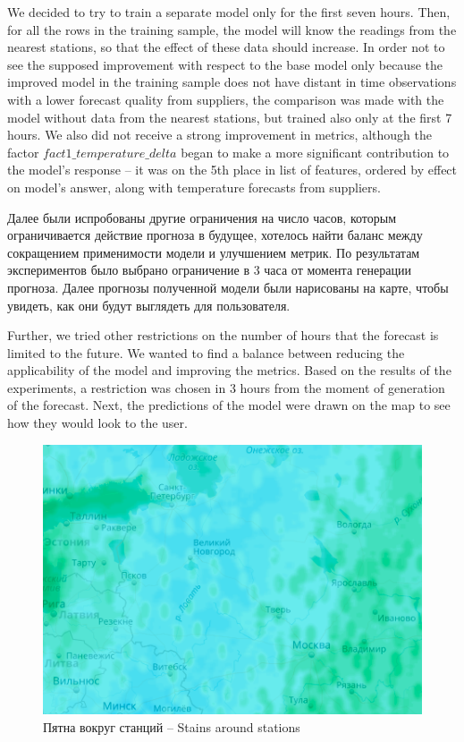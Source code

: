 \documentclass[14pt]{matmex-diploma}
\begin{document}
We decided to try to train a separate model only for the first seven hours. Then, for all the rows in the training sample, the model will know the readings from the nearest stations, so that the effect of these data should increase. In order not to see the supposed improvement with respect to the base model only because the improved model in the training sample does not have distant in time observations with a lower forecast quality from suppliers, the comparison was made with the model without data from the nearest stations, but trained also only at the first 7 hours. We also did not receive a strong improvement in metrics, although the factor $fact1\_temperature\_delta$ began to make a more significant contribution to the model's response -- it was on the 5th place in list of features, ordered by effect on model's answer, along with temperature forecasts from suppliers.


Далее были испробованы другие ограничения на число часов, которым ограничивается действие прогноза в будущее, хотелось найти баланс между сокращением применимости модели и улучшением метрик. По результатам экспериментов было выбрано ограничение в 3 часа от момента генерации прогноза. Далее прогнозы полученной модели были нарисованы на карте, чтобы увидеть, как они будут выглядеть для пользователя.

Further, we tried other restrictions on the number of hours that the forecast is limited to the future. We wanted to find a balance between reducing the applicability of the model and improving the metrics. Based on the results of the experiments, a restriction was chosen in 3 hours from the moment of generation of the forecast. Next, the predictions of the model were drawn on the map to see how they would look to the user.

\begin{figure}
\centering
\includegraphics[width=0.7\linewidth]{images/pic2_map.png}
\caption{Пятна вокруг станций -- Stains around stations}
\label{pic2_map}
\end{figure}
\end{document}
